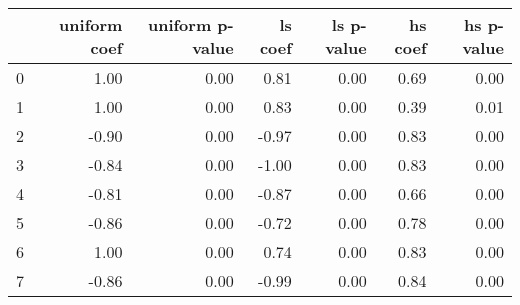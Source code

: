 \begin{tabular}{lrrrrrr}
\toprule
 & uniform coef & uniform p-value & ls coef & ls p-value & hs coef & hs p-value \\
\midrule
0 & 1.00 & 0.00 & 0.81 & 0.00 & 0.69 & 0.00 \\
1 & 1.00 & 0.00 & 0.83 & 0.00 & 0.39 & 0.01 \\
2 & -0.90 & 0.00 & -0.97 & 0.00 & 0.83 & 0.00 \\
3 & -0.84 & 0.00 & -1.00 & 0.00 & 0.83 & 0.00 \\
4 & -0.81 & 0.00 & -0.87 & 0.00 & 0.66 & 0.00 \\
5 & -0.86 & 0.00 & -0.72 & 0.00 & 0.78 & 0.00 \\
6 & 1.00 & 0.00 & 0.74 & 0.00 & 0.83 & 0.00 \\
7 & -0.86 & 0.00 & -0.99 & 0.00 & 0.84 & 0.00 \\
\bottomrule
\end{tabular}
